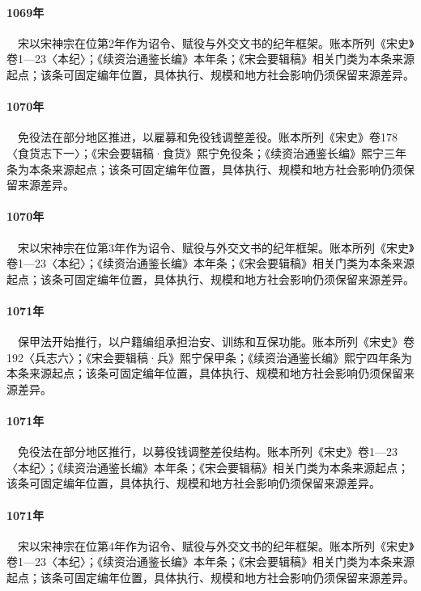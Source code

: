 \paragraph{1069年}　宋以宋神宗在位第2年作为诏令、赋役与外交文书的纪年框架。账本所列《宋史》卷1—23〈本纪〉；《续资治通鉴长编》本年条；《宋会要辑稿》相关门类为本条来源起点；该条可固定编年位置，具体执行、规模和地方社会影响仍须保留来源差异。

\paragraph{1070年}　免役法在部分地区推进，以雇募和免役钱调整差役。账本所列《宋史》卷178〈食货志下一〉；《宋会要辑稿·食货》熙宁免役条；《续资治通鉴长编》熙宁三年条为本条来源起点；该条可固定编年位置，具体执行、规模和地方社会影响仍须保留来源差异。

\paragraph{1070年}　宋以宋神宗在位第3年作为诏令、赋役与外交文书的纪年框架。账本所列《宋史》卷1—23〈本纪〉；《续资治通鉴长编》本年条；《宋会要辑稿》相关门类为本条来源起点；该条可固定编年位置，具体执行、规模和地方社会影响仍须保留来源差异。

\paragraph{1071年}　保甲法开始推行，以户籍编组承担治安、训练和互保功能。账本所列《宋史》卷192〈兵志六〉；《宋会要辑稿·兵》熙宁保甲条；《续资治通鉴长编》熙宁四年条为本条来源起点；该条可固定编年位置，具体执行、规模和地方社会影响仍须保留来源差异。

\paragraph{1071年}　免役法在部分地区推行，以募役钱调整差役结构。账本所列《宋史》卷1—23〈本纪〉；《续资治通鉴长编》本年条；《宋会要辑稿》相关门类为本条来源起点；该条可固定编年位置，具体执行、规模和地方社会影响仍须保留来源差异。

\paragraph{1071年}　宋以宋神宗在位第4年作为诏令、赋役与外交文书的纪年框架。账本所列《宋史》卷1—23〈本纪〉；《续资治通鉴长编》本年条；《宋会要辑稿》相关门类为本条来源起点；该条可固定编年位置，具体执行、规模和地方社会影响仍须保留来源差异。

